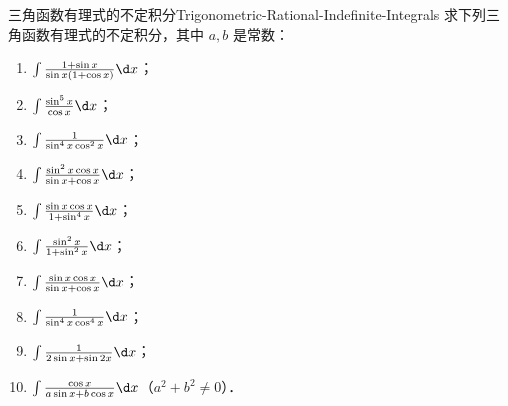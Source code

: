 \begin{problem}{三角函数有理式的不定积分}{Trigonometric-Rational-Indefinite-Integrals}
    求下列三角函数有理式的不定积分，其中 $a, b$ 是常数：
    \begin{enumerate}
        \item $\int \frac{1 + \sin x}{\sin x(1 + \cos x)} \d x$；
        \item $\int \frac{\sin^5 x}{\cos x} \d x$；
        \item $\int \frac{1}{\sin^4 x \cos^2 x} \d x$；
        \item $\int \frac{\sin^2 x \cos x}{\sin x + \cos x} \d x$；
        \item $\int \frac{\sin x \cos x}{1 + \sin^4 x} \d x$；
        \item $\int \frac{\sin^2 x}{1 + \sin^2 x} \d x$；
        \item $\int \frac{\sin x \cos x}{\sin x + \cos x} \d x$；
        \item $\int \frac{1}{\sin^4 x \cos^4 x} \d x$；
        \item $\int \frac{1}{2\sin x + \sin 2x} \d x$；
        \item $\int \frac{\cos x}{a\sin x + b\cos x} \d x$（$a^2 + b^2 \neq 0$）．
    \end{enumerate}
\end{problem}

